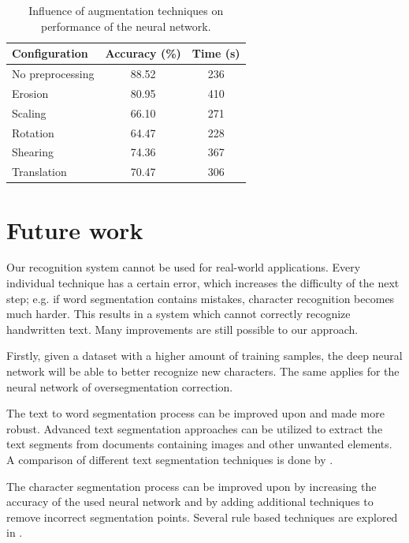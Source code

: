 \documentclass{article}
\begin{document}
\begin{table}
\caption{Influence of augmentation techniques on performance of the neural network.}
\label{tab:preprocess}
\vskip 0.15in
\begin{center}
\begin{small}
\begin{sc}
\begin{tabular}{lcc}
\hline
\abovespace\belowspace
Configuration & Accuracy (\%) & Time (s) \\
\hline
\abovespace
No preprocessing & 88.52 & 236 \\
Erosion & 80.95 & 410 \\
Scaling & 66.10 & 271 \\
Rotation & 64.47 & 228 \\
Shearing & 74.36 & 367 \\
Translation & 70.47 & 306 \\
\hline
\end{tabular}
\end{sc}
\end{small}
\end{center}
\vskip -0.1in
\end{table}


\section{Future work}
Our recognition system cannot be used for real-world applications. Every individual technique has a certain error, which increases the difficulty of the next step; e.g. if word segmentation contains mistakes, character recognition becomes much harder.
This results in a system which cannot correctly recognize handwritten text.
Many improvements are still possible to our approach.

Firstly, given a dataset with a higher amount of training samples, the deep neural network will be able to better recognize new characters. The same applies for the neural network of oversegmentation correction.

The text to word segmentation process can be improved upon and made more robust.
Advanced text segmentation approaches can be utilized to extract the text segments from documents containing images and other unwanted elements. A comparison of different text segmentation techniques is done by \cite{textsegm}.

The character segmentation process can be improved upon by increasing the accuracy of the used neural network and by adding additional techniques to remove incorrect segmentation points. Several rule based techniques are explored in \cite{segmtechniques}.
\end{document}
